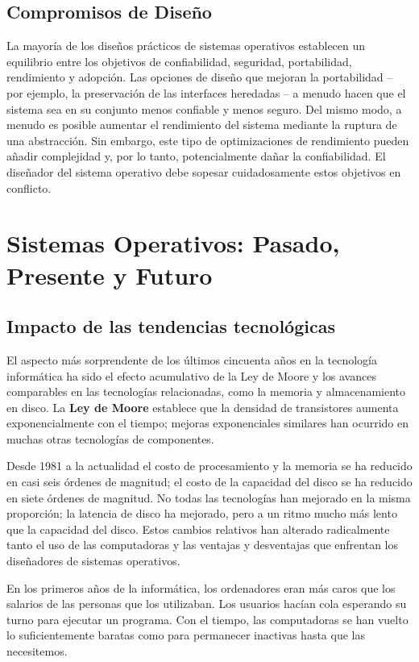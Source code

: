 \documentclass[10pt]{book}
\begin{document}
\subsection{Compromisos de Diseño}
La mayoría de los diseños prácticos de sistemas operativos establecen un equilibrio entre los objetivos de confiabilidad, seguridad, portabilidad, rendimiento y adopción. Las opciones de diseño que mejoran la portabilidad -- por ejemplo, la preservación de las interfaces heredadas -- a menudo hacen que el sistema sea en su conjunto menos confiable y menos seguro. Del mismo modo, a menudo es posible aumentar el rendimiento del sistema mediante la ruptura de una abstracción. Sin embargo, este tipo de optimizaciones de rendimiento pueden añadir complejidad y, por lo tanto, potencialmente dañar la confiabilidad. El diseñador del sistema operativo debe sopesar cuidadosamente estos objetivos en conflicto.


\section{Sistemas Operativos: Pasado, Presente y Futuro}

\subsection{Impacto de las tendencias tecnológicas}
El aspecto más sorprendente de los últimos cincuenta años en la tecnología informática ha sido el efecto acumulativo de la Ley de Moore y los avances comparables en las tecnologías relacionadas, como la memoria y almacenamiento en disco. La \textbf{Ley de Moore} establece que la densidad de transistores aumenta exponencialmente con el tiempo; mejoras exponenciales similares han ocurrido en muchas otras tecnologías de componentes.

Desde 1981 a la actualidad el costo de procesamiento y la memoria se ha reducido en casi seis órdenes de magnitud; el costo de la capacidad del disco se ha reducido en siete órdenes de magnitud. No todas las tecnologías han mejorado en la misma proporción; la latencia de disco ha mejorado, pero a un ritmo mucho más lento que la capacidad del disco. Estos cambios relativos han alterado radicalmente tanto el uso de las computadoras y las ventajas y desventajas que enfrentan los diseñadores de sistemas operativos.

En los primeros años de la informática, los ordenadores eran más caros que los salarios de las personas que los utilizaban. Los usuarios hacían cola esperando su turno para ejecutar un programa. Con el tiempo, las computadoras se han vuelto lo suficientemente baratas como para permanecer inactivas hasta que las necesitemos.
\end{document}
